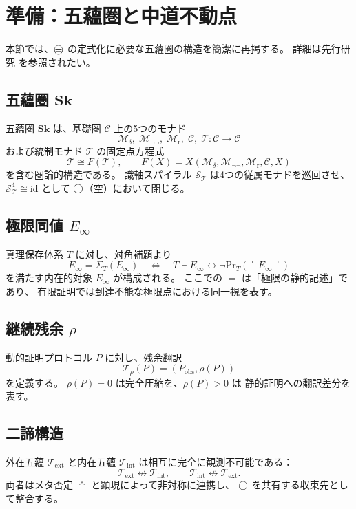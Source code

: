 \documentclass[11pt,a4paper]{article}
\theoremstyle{definition}
\newcommand{\Sk}{\mathbf{Sk}}
\newcommand{\T}{\mathcal{T}}
\newcommand{\TExt}{\T_{\mathrm{ext}}}
\newcommand{\TInt}{\T_{\mathrm{int}}}
\newcommand{\SpiralT}{\mathcal{S}_{\T}}
\newcommand{\SelfRef}{\Sigma}
\newcommand{\Einfty}{E_{\infty}}
\newcommand{\id}{\mathrm{id}}
\renewcommand{\Pr}{\mathrm{Pr}}
\newcommand{\Mdelta}{\mathcal{M}_{\delta}}
\newcommand{\Mneg}{\mathcal{M}_{\neg\neg}}
\newcommand{\Mr}{\mathcal{M}_{\mathrm{r}}}
\newcommand{\Mc}{\mathcal{C}}
\begin{document}
\section{準備：五蘊圏と中道不動点}

本節では、$\mweq$ の定式化に必要な五蘊圏の構造を簡潔に再掲する。
詳細は先行研究 \cite{Chiba2026skandha,Chiba2026einfty} を参照されたい。

\subsection{五蘊圏 \texorpdfstring{$\Sk$}{Sk}}

五蘊圏 $\Sk$ は、基礎圏 $\mathcal{C}$ 上の5つのモナド
\[
\Mdelta,\; \Mneg,\; \Mr,\; \Mc,\; \T : \mathcal{C}\to\mathcal{C}
\]
および統制モナド $\T$ の固定点方程式
\[
\T \cong F(\T),\qquad F(X)=X(\Mdelta,\Mneg,\Mr,\Mc,X)
\]
を含む圏論的構造である。
識軸スパイラル $\SpiralT$ は4つの従属モナドを巡回させ、
$\SpiralT^4\cong\id$ として $\bigcirc$（空）において閉じる。

\subsection{極限同値 \texorpdfstring{$E_\infty$}{E-infinity}}

真理保存体系 $T$ に対し、対角補題より
\[
\Einfty = \SelfRef_T(\Einfty)
\quad\Longleftrightarrow\quad
T\vdash \Einfty\leftrightarrow\neg\Pr_T(\ulcorner\Einfty\urcorner)
\]
を満たす内在的対象 $\Einfty$ が構成される。
ここでの $=$ は「極限の静的記述」であり、
有限証明では到達不能な極限点における同一視を表す。

\subsection{継続残余 \texorpdfstring{$\rho$}{rho}}

動的証明プロトコル $P$ に対し、残余翻訳
\[
\mathcal{T}_\rho(P)=(P_{\mathrm{obs}},\rho(P))
\]
を定義する。
$\rho(P)=0$ は完全圧縮を、$\rho(P)>0$ は
静的証明への翻訳差分を表す。

\subsection{二諦構造}

外在五蘊 $\TExt$ と内在五蘊 $\TInt$ は相互に完全に観測不可能である：
\[
\TExt\not\leftrightarrow\TInt,\qquad \TInt\not\leftrightarrow\TExt.
\]
両者はメタ否定 $\Uparrow$ と顕現によって非対称に連携し、
$\bigcirc$ を共有する収束先として整合する。
\end{document}
